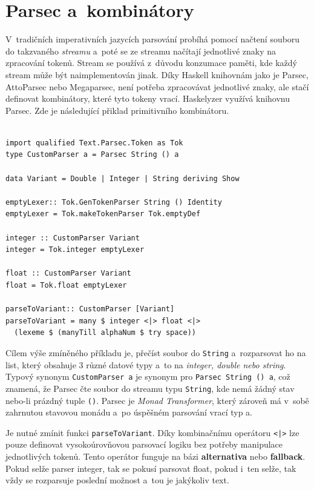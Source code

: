 \documentclass[male, czech]{kithesis}
\newenvironment{code}{\captionsetup{type=listing}}{}
\newcommand{\haskellInline}[1]{\colorbox{gray!10}{\texttt{#1}}}
\begin{document}
\section{Parsec a~kombinátory}

V~tradičních imperativních jazycích parsování probíhá pomocí načtení souboru 
do takzvaného \textit{streamu}
a~poté se ze streamu načítají jednotlivé znaky na zpracování tokenů. 
Stream se používá z~důvodu konzumace paměti, 
kde každý stream může být naimplementován jinak.
Díky Haskell knihovnám jako je Parsec, 
AttoParsec nebo Megaparsec,
není potřeba zpracovávat jednotlivé znaky, 
ale stačí definovat kombinátory, 
které tyto tokeny vrací. 
Haskelyzer využívá knihovnu Parsec. 
Zde je následující přiklad primitivního kombinátoru.

\begin{code}
\begin{verbatim}

import qualified Text.Parsec.Token as Tok
type CustomParser a = Parsec String () a

data Variant = Double | Integer | String deriving Show

emptyLexer:: Tok.GenTokenParser String () Identity
emptyLexer = Tok.makeTokenParser Tok.emptyDef

integer :: CustomParser Variant 
integer = Tok.integer emptyLexer 

float :: CustomParser Variant 
float = Tok.float emptyLexer 

parseToVariant:: CustomParser [Variant]
parseToVariant = many $ integer <|> float <|> 
  (lexeme $ (manyTill alphaNum $ try space))

\end{verbatim}
\end{code}

Cílem výše zmíněného příkladu je, 
přečíst soubor do \haskellInline{String} 
a~rozparsovat ho na list, 
který obsahuje 3 různé datové typy 
a~to na \textit{integer, double nebo string}.
Typový synonym \haskellInline{CustomParser a} 
je synonym pro \haskellInline{Parsec String () a},
což znamená, 
že Parsec čte soubor do streamu typu \haskellInline{String}, 
kde nemá žádný stav nebo-li prázdný tuple \haskellInline{()}. 
Parsec je \textit{Monad Transformer},
který zároveň má v~sobě zahrnutou stavovou monádu
a~po úspěšném parsování vrací typ a. 

Je nutné zmínit funkci \haskellInline{parseToVariant}. 
Díky kombinačnímu operátoru \haskellInline{<|>} 
lze pouze definovat vysokoúrovňovou parsovací logiku bez potřeby manipulace jednotlivých tokenů. 
Tento operátor funguje na bázi \textbf{alternativa} nebo
\textbf{fallback}. 
Pokud selže parser integer, 
tak se pokusí parsovat float, 
pokud i~ten selže, 
tak vždy se rozparsuje poslední možnost
a~tou je jakýkoliv text.
\end{document}
